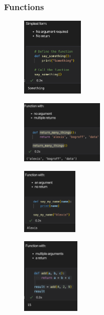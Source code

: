 \begin{frame}\frametitle{Functions}
   \begin{minipage}{0.38\linewidth}
      \begin{figure}[H]
         \includegraphics[width=3cm]{../images/illustrations/fct1.png}
      \end{figure}
      \begin{figure}[H]
         \includegraphics[width=4cm]{../images/illustrations/fct5.png}
      \end{figure}
   \end{minipage}
   \begin{minipage}{0.28\linewidth}
      \begin{figure}[H]
         \includegraphics[width=2.7cm]{../images/illustrations/fct2.png}
      \end{figure}
      \begin{figure}[H]
         \includegraphics[width=2.8cm]{../images/illustrations/fct4.png}
      \end{figure}
   \end{minipage}

\end{frame}
